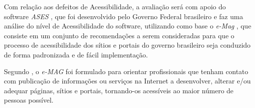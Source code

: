   Com relação aos defeitos de Acessibilidade, a avaliação será com apoio do software \textit{ASES} \cite{avaliacao_ases}, que foi desenvolvido pelo Governo Federal brasileiro e faz uma análise do nível de Acessibilidade do software, utilizando como base o \textit{e-Mag} \cite{e_mag}, que consiste em um conjunto de recomendações a serem consideradas para que o processo de acessibilidade dos sítios e portais do governo brasileiro seja conduzido de forma padronizada e de fácil implementação.

  Segundo \cite{e_mag}, o \textit{e-MAG} foi formulado para orientar profissionais que tenham contato com publicação de informações ou serviços na Internet a desenvolver, alterar e/ou adequar páginas, sítios e portais, tornando-os acessíveis ao maior número de pessoas possível.